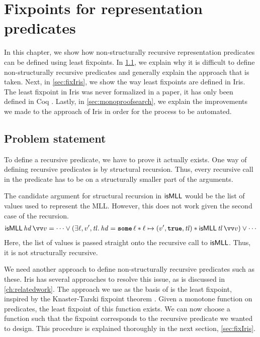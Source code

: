 \documentclass[thesis.tex]{subfiles}
\begin{document}
\chapter{Fixpoints for representation predicates} \label{ch:fixpoints}
In this chapter, we show how non-structurally recursive representation predicates can be defined using least fixpoints. In \cref{sec:fixproblem}, we explain why it is difficult to define non-structurally recursive predicates and generally explain the approach that is taken. Next, in \cref{sec:fixIris}, we show the way least fixpoints are defined in Iris. The least fixpoint in Iris was never formalized in a paper, it has only been defined in Coq \cite{krebbersIris2024}. Lastly, in \cref{sec:monoproofsearch}, we explain the improvements we made to the approach of Iris in order for the process to be automated.

\section{Problem statement} \label{sec:fixproblem}
To define a recursive predicate, we have to prove it actually exists. One way of defining recursive predicates is by structural recursion. Thus, every recursive call in the predicate has to be on a structurally smaller part of the arguments.

The candidate argument for structural recursion in $\textsf{\upshape isMLL}$ would be the list of values used to represent the MLL. However, this does not work given the second case of the recursion.
\begin{align*}
    \isMLL\,\hd\,\vect{\val} = \cdots \lor (\Exists \loc, \val', \tl. \hd = \Some \loc * \loc \fmapsto (\val', \True, \tl) * \isMLL\, \tl\, \vect{\val}) \lor \cdots
\end{align*}
Here, the list of values is passed straight onto the recursive call to $\textsf{\upshape isMLL}$. Thus, it is not structurally recursive.

We need another approach to define non-structurally recursive predicates such as these. Iris has several approaches to resolve this issue, as is discussed in \cref{ch:relatedwork}. The approach we use as the basis of  is the least fixpoint, inspired by the Knaster-Tarski fixpoint theorem \cite*{tarskiLatticetheoreticalFixpointTheorem1955}. Given a monotone function on predicates, the least fixpoint of this function exists. We can now choose a function such that the fixpoint corresponds to the recursive predicate we wanted to design. This procedure is explained thoroughly in the next section, \cref{sec:fixIris}.
\end{document}
